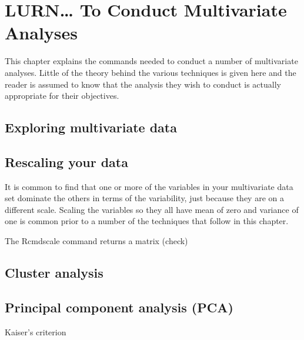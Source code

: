

\chapter{LURN\ldots{} To Conduct Multivariate Analyses} 
\label{Multivariate} 
 



 
This chapter explains the commands needed to conduct a number of multivariate analyses. Little of the theory behind the various techniques is given here and the reader is assumed to know that the analysis they wish to conduct is actually appropriate for their objectives. 
 
\section{Exploring multivariate data} 
 
 
\section{} 
 
 
\section{Rescaling your data} 
 
It is common to find that one or more of the variables in your multivariate data set dominate the others in terms of the variability, just because they are on a different scale. Scaling the variables so they all have mean of zero and variance of one is common prior to a number of the techniques that follow in this chapter. 
 
The Rcmd{scale} command returns a matrix (check)  
 
\section{Cluster analysis} 
 
\section{Principal component analysis (PCA)} 
 
Kaiser's criterion 
 
